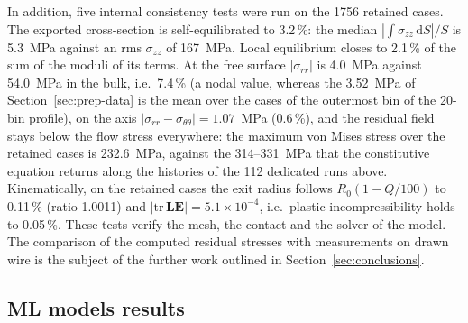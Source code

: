 \documentclass[subscriptcorrection,upint,varvw,barcolor=Goldenrod3,mathalfa=cal=euler,balance,hyphenate,french,pdf-a]{asmejour} %
\begin{document}
In addition, five internal consistency tests were run on the 1756 retained cases. The exported cross-section is self-equilibrated to 3.2\,\%: the median $|\int\sigma_{zz}\,\mathrm{d}S|/S$ is 5.3~MPa against an rms $\sigma_{zz}$ of 167~MPa. %
Local equilibrium closes to 2.1\,\% of the sum of the moduli of its terms. %
At the free surface $|\sigma_{rr}|$ is 4.0~MPa against 54.0~MPa in the bulk, i.e.\ 7.4\,\% (a nodal value, whereas the 3.52~MPa of Section~\ref{sec:prep-data} is the mean over the cases of the outermost bin of the 20-bin profile), %
on the axis $|\sigma_{rr}-\sigma_{\theta\theta}| = 1.07$~MPa (0.6\,\%), %
and the residual field stays below the flow stress everywhere: the maximum von Mises stress over the retained cases is 232.6~MPa, against the 314--331~MPa that the constitutive equation returns along the histories of the 112 dedicated runs above.
Kinematically, on the retained cases the exit radius follows $R_0(1-Q/100)$ to 0.11\,\% (ratio 1.0011) and $|\mathrm{tr}\,\mathbf{LE}| = 5.1\times10^{-4}$, i.e.\ plastic incompressibility holds to 0.05\,\%. %
These tests verify the mesh, the contact and the solver of the model. The comparison of the computed residual stresses with measurements on drawn wire is the subject of the further work outlined in Section~\ref{sec:conclusions}. %

\subsection{ML models results}
\label{sec:results}
\end{document}

